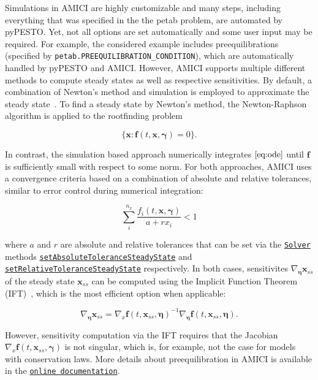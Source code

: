 \documentclass[11pt]{article}
\newcommand{\dims}[1]{{n_{#1}}}
\begin{document}
    Simulations in AMICI are highly customizable and many steps, including
everything that was specified in the the petab problem, are automated by
pyPESTO. Yet, not all options are set automatically and some user input
may be required. For example, the considered example includes
preequilibrations (specified by
\texttt{petab.PREEQUILIBRATION\_CONDITION}), which are automatically
handled by pyPESTO and AMICI. However, AMICI supports multiple different
methods to compute steady states as well as respective sensitivities. By
default, a combination of Newton's method and simulation is employed to
approximate the steady state~\cite{2754712/LVNQBT95}. To find a steady
state by Newton's method, the Newton-Raphson algorithm is applied to the
rootfinding problem

\[ \{\textbf{x}: \textbf{f}(t,\textbf{x},\boldsymbol{\gamma}) = 0\}. \]

In contrast, the simulation based approach numerically integrates
\(\eqref{eq:ode}\) until \(\textbf{f}\) is sufficiently small with
respect to some norm. For both approaches, AMICI uses a convergence
criteria based on a combination of absolute and relative tolerances,
similar to error control during numerical integration:

\[ \sum_i^{\dims{x}} \frac{f_i(t,\textbf{x},\boldsymbol{\gamma})}{a + r x_i} < 1\]

where \(a\) and \(r\) are absolute and relative tolerances that can be
set via the
\href{https://amici.readthedocs.io/en/latest/generated/amici.amici.Solver.html\#amici.amici.Solver}{\texttt{Solver}}
methods
\href{https://amici.readthedocs.io/en/latest/generated/amici.amici.Solver.html\#amici.amici.Solver.setAbsoluteToleranceSteadyState}{\texttt{setAbsoluteToleranceSteadyState}}
and
\href{https://amici.readthedocs.io/en/latest/generated/amici.amici.Solver.html\#amici.amici.Solver.setRelativeToleranceSteadyState}{\texttt{setRelativeToleranceSteadyState}}
respectively. In both cases, sensitivites
\(\nabla_{\boldsymbol{\eta}}\textbf{x}_{ss}\) of the steady state
\(\textbf{x}_{ss}\) can be computed using the Implicit Function Theorem
(IFT)~\cite{2754712/6AWGLSM9}, which is the most efficient option when
applicable:

\[ \nabla_{\boldsymbol{\eta}}\textbf{x}_{ss} = \nabla_x\textbf{f}(t,\textbf{x}_{ss},\boldsymbol{\eta})^{-1}\nabla_{\boldsymbol{\eta}}\textbf{f}(t,\textbf{x}_{ss},\boldsymbol{\eta}) . \]

However, sensitivity computation via the IFT requires that the Jacobian
\(\nabla_x\textbf{f}(t,\textbf{x}_{ss},\boldsymbol{\gamma})\) is not
singular, which is, for example, not the case for models with
conservation laws. More details about preequilibration in AMICI is
available in the
\href{https://amici.readthedocs.io/en/latest/ExampleEquilibrationLogic.html}{\texttt{online\ documentation}}.
\end{document}
